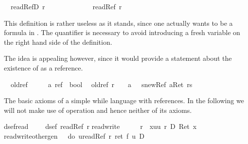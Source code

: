 \begin{isabellebody}
\isanewline
\isamarkupfalse%
\isanewline
\ \ {\isachardoublequote}{\isacharunderscore}readRefD\ r{\isachardoublequote}\ \ \ \ \ \ \ \ \ {\isasymrightleftharpoons}\ \ \ \ {\isachardoublequote}{\isasymUp}\ {\isacharparenleft}readRef\ r{\isacharparenright}{\isachardoublequote}\isamarkupfalse%
%
\begin{isamarkuptext}%
This definition is rather useless as it stands, since one actually wants
   to be a formula in . The quantifier is necessary to
  avoid introducing a fresh variable  on the right hand side of the
  definition.
  
  The idea is appealing however, since it would provide a statement about the
  existence of  as a reference.%
\end{isamarkuptext}%
\isamarkuptrue%
\isanewline
\ \ oldref\ \ \ \ \ {\isacharcolon}{\isacharcolon}\ {\isachardoublequote}{\isacharprime}a\ ref\ {\isasymRightarrow}\ bool{\isachardoublequote}\isanewline
\ \ {\isachardoublequote}oldref\ r\ \ {\isasymequiv}\ \ {\isasymforall}a{\isachardot}\ {\isasymturnstile}\ {\isacharbrackleft}{\isacharhash}\ s{\isasymleftarrow}newRef\ a{\isacharbrackright}{\isacharparenleft}Ret\ {\isacharparenleft}{\isasymnot}{\isacharparenleft}r{\isacharequal}s{\isacharparenright}{\isacharparenright}{\isacharparenright}{\isachardoublequote}\isamarkupfalse%
%
\begin{isamarkuptext}%
The basic axioms of a simple while language with references. In the following we will not
  make use of operation  and hence neither of its axioms.%
\end{isamarkuptext}%
\isamarkuptrue%
\isanewline
dsef{\isacharunderscore}read{\isacharcolon}\ \ \ \ \ {\isachardoublequote}dsef\ {\isacharparenleft}readRef\ r{\isacharparenright}{\isachardoublequote}\isanewline
read{\isacharunderscore}write{\isacharcolon}\ \ \ \ {\isachardoublequote}{\isasymturnstile}\ {\isacharbrackleft}{\isacharhash}\ r\ {\isacharcolon}{\isacharequal}\ x{\isacharbrackright}{\isacharparenleft}{\isasymlambda}uu{\isachardot}\ {\isacharasterisk}r\ {\isacharequal}\isactrlsub D\ Ret\ x{\isacharparenright}{\isachardoublequote}\isanewline
read{\isacharunderscore}write{\isacharunderscore}other{\isacharunderscore}gen{\isacharcolon}\ {\isachardoublequote}{\isasymturnstile}\ {\isasymUp}\ {\isacharparenleft}do\ {\isacharbraceleft}u{\isasymleftarrow}readRef\ r{\isacharsemicolon}\ ret\ {\isacharparenleft}f\ u{\isacharparenright}{\isacharbraceright}{\isacharparenright}\ {\isasymlongrightarrow}\isactrlsub D\ \isanewline

\end{isabellebody}
